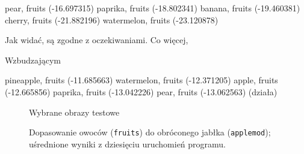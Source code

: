 \documentclass[a4paper,12pt,leqno]{article}
\begin{document}
pear, fruits (-16.697315)
paprika, fruits (-18.802341)
banana, fruits (-19.460381)
cherry, fruits (-21.882196)
watermelon, fruits (-23.120878)

Jak widać, są zgodne z oczekiwaniami. Co więcej, 


Wzbudzającym 

pineapple, fruits (-11.685663)
watermelon, fruits (-12.371205)
apple, fruits (-12.665856)
paprika, fruits (-13.042226)
pear, fruits (-13.062563) (działa)




\begin{figure}\centering
{}
\caption{Wybrane obrazy testowe}
\end{figure}

\begin{figure}\centering
\footnotesize\vspace{-2em}
\normalsize\caption{Dopasowanie owoców (\texttt{fruits}) do obróconego jabłka (\texttt{applemod}); uśrednione wyniki z dziesięciu uruchomień programu.}
\end{figure} 
\end{document}
